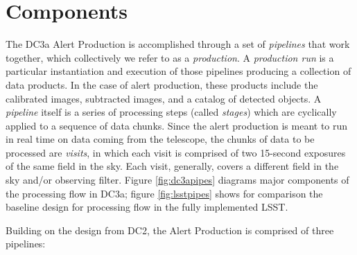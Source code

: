 
\section{Components}  \label{sec:components}

The DC3a Alert Production is accomplished through a set of
\textit{pipelines} that work together, which collectively we refer to
as a \textit{production}.  A \textit{production run} is a particular
instantiation and execution of those pipelines producing a
collection of data products. In the case of alert production, these products include
the calibrated images, subtracted images, and a catalog of detected objects.  A
\textit{pipeline} itself is a series of processing steps (called
\textit{stages}) which are cyclically applied to a sequence of data
chunks.  Since the alert production is meant to run in real time on data
coming from the telescope, the chunks of data to be processed are 
 \textit{visits}, in which each visit is comprised of two
15-second exposures of the same field in the sky.  Each visit,
generally, covers a different field in the sky and/or observing filter.    
Figure \ref{fig:dc3apipes} diagrams major components of the processing flow in DC3a;
figure \ref{fig:lsstpipes} shows for comparison the baseline design for processing 
flow in the fully implemented LSST.

Building on the design from DC2, the Alert Production is comprised of
three pipelines: 


